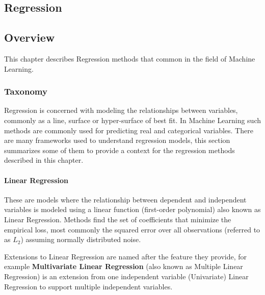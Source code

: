 

\renewcommand{\bibsection}{\subsection{\bibname}}
\begin{bibunit}

\chapter{Regression}
\label{ch:regression}

\section{Overview}
This chapter describes Regression methods that common in the field of Machine Learning.

\subsection{Taxonomy}
Regression is concerned with modeling the relationships between variables, commonly as a line, surface or hyper-surface of best fit. In Machine Learning such methods are commonly used for predicting real and categorical variables. There are many frameworks used to understand regression models, this section summarizes some of them to provide a context for the regression methods described in this chapter.

\subsubsection{Linear Regression}
These are models where the relationship between dependent and independent variables is modeled using a linear function (first-order polynomial) also known as Linear Regression. Methods find the set of coefficients that minimize the empirical loss, most commonly the squared error over all observations (referred to as $L_2$) assuming normally distributed noise.

Extensions to Linear Regression are named after the feature they provide, for example \textbf{Multivariate Linear Regression} (also known as Multiple Linear Regression) is an extension from one independent variable (Univariate) Linear Regression to support multiple independent variables.


\end{bibunit}
